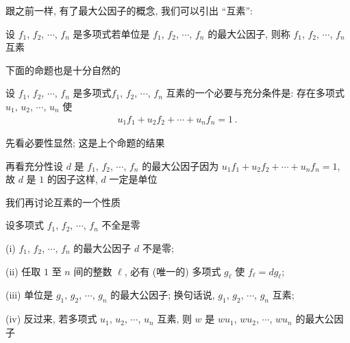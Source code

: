 跟之前一样, 有了最大公因子的概念, 我们可以引出 ``互素'':
\begin{definition}
    设 $f_1$, $f_2$, $\cdots$, $f_n$ 是多项式\period 若单位是 $f_1$, $f_2$, $\cdots$, $f_n$ 的最大公因子, 则称 $f_1$, $f_2$, $\cdots$, $f_n$ 互素\period
\end{definition}

下面的命题也是十分自然的\period
\begin{proposition}
    设 $f_1$, $f_2$, $\cdots$, $f_n$ 是多项式\period $f_1$, $f_2$, $\cdots$, $f_n$ 互素的一个必要与充分条件是: 存在多项式 $u_1$, $u_2$, $\cdots$, $u_n$ 使
    \begin{align*}
        u_1 f_1 + u_2 f_2 + \cdots + u_n f_n = 1 \period
    \end{align*}
\end{proposition}

\begin{pf}
    先看必要性\period 显然; 这是上个命题的结果\period

    再看充分性\period 设 $d$ 是 $f_1$, $f_2$, $\cdots$, $f_n$ 的最大公因子\period 因为 $u_1 f_1 + u_2 f_2 + \cdots + u_n f_n = 1$, 故 $d$ 是 $1$ 的因子\period 这样, $d$ 一定是单位\period
\end{pf}

我们再讨论互素的一个性质\period

\begin{proposition}
    设多项式 $f_1$, $f_2$, $\cdots$, $f_n$ 不全是零\period

    (i) $f_1$, $f_2$, $\cdots$, $f_n$ 的最大公因子 $d$ 不是零;

    (ii) 任取 $1$ 至 $n$ 间的整数 $\ell$, 必有 (唯一的) 多项式 $g_\ell$ 使 $f_\ell = dg_\ell$;

    (iii) 单位是 $g_1$, $g_2$, $\cdots$, $g_n$ 的最大公因子; 换句话说, $g_1$, $g_2$, $\cdots$, $g_n$ 互素;

    (iv) 反过来, 若多项式 $u_1$, $u_2$, $\cdots$, $u_n$ 互素, 则 $w$ 是 $wu_1$, $wu_2$, $\cdots$, $wu_n$ 的最大公因子\period
\end{proposition}

